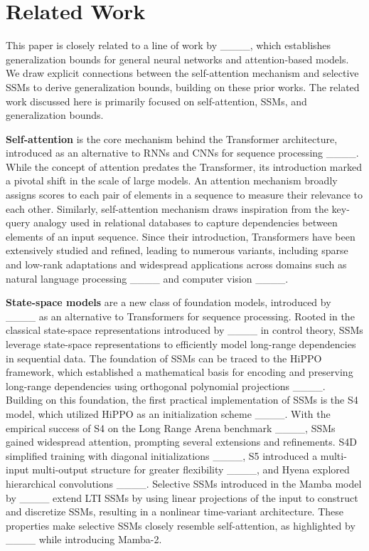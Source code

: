 \section{Related Work}
This paper is closely related to a line of work by ____, which establishes generalization bounds for general neural networks and attention-based models. We draw explicit connections between the self-attention mechanism and selective SSMs to derive generalization bounds, building on these prior works. The related work discussed here is primarily focused on self-attention, SSMs, and generalization bounds.

\textbf{Self-attention} is the core mechanism behind the Transformer architecture, introduced as an alternative to RNNs and CNNs for sequence processing ____. While the concept of attention predates the Transformer, its introduction marked a pivotal shift in the scale of large models. An attention mechanism broadly assigns scores to each pair of elements in a sequence to measure their relevance to each other. Similarly, self-attention mechanism draws inspiration from the key-query analogy used in relational databases to capture dependencies between elements of an input sequence. Since their introduction, Transformers have been extensively studied and refined, leading to numerous variants, including sparse and low-rank adaptations and widespread applications across domains such as natural language processing ____ and computer vision ____.

\textbf{State-space models} are a new class of foundation models, introduced by ____ as an alternative to Transformers for sequence processing. Rooted in the classical state-space representations introduced by ____ in control theory, SSMs leverage state-space representations to efficiently model long-range dependencies in sequential data. The foundation of SSMs can be traced to the HiPPO framework, which established a mathematical basis for encoding and preserving long-range dependencies using orthogonal polynomial projections ____. Building on this foundation, the first practical implementation of SSMs is the S4 model, which utilized HiPPO as an initialization scheme ____. With the empirical success of S4 on the Long Range Arena benchmark ____, SSMs gained widespread attention, prompting several extensions and refinements. S4D simplified training with diagonal initializations ____, S5 introduced a multi-input multi-output structure for greater flexibility ____, and Hyena explored hierarchical convolutions ____. Selective SSMs introduced in the Mamba model by ____ extend LTI SSMs by using linear projections of the input to construct and discretize SSMs, resulting in a nonlinear time-variant architecture. These properties make selective SSMs closely resemble self-attention, as highlighted by ____ while introducing Mamba-2. 

